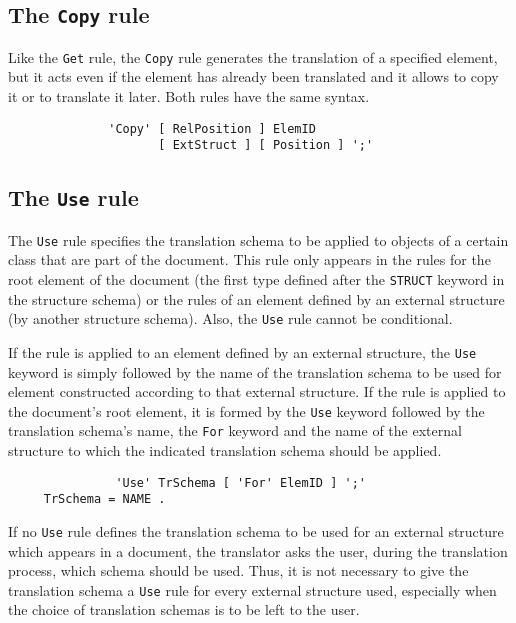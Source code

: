 \subsection{The {\tt Copy} rule}

Like the {\tt Get} rule, the {\tt Copy} rule generates the translation
of a specified element, but it acts even if the element has already been
translated and it allows to copy it or to translate it later.
Both rules have the same syntax.

\begin{verbatim}
              'Copy' [ RelPosition ] ElemID 
                     [ ExtStruct ] [ Position ] ';'
\end{verbatim}

\subsection{The {\tt Use} rule}

The {\tt Use} rule specifies the translation schema to be applied to
objects of a certain class that are part of the document.  This rule
only appears in the rules for the root element of the document (the
first type defined after the {\tt STRUCT} keyword in the structure
schema) or the rules of an element defined by an external structure
(by another structure schema).  Also, the {\tt Use} rule cannot be
conditional.

If the rule is applied to an element defined by an external structure,
the {\tt Use} keyword is simply followed by the name of the
translation schema to be used for element constructed  according to
that external structure.  If the rule is applied to the document's
root element, it is formed by the {\tt Use} keyword followed by the
translation schema's name, the {\tt For} keyword and the name of the
external structure to which the indicated translation schema should be
applied.

\begin{verbatim}
               'Use' TrSchema [ 'For' ElemID ] ';'
     TrSchema = NAME .
\end{verbatim}

If no {\tt Use} rule defines the translation schema to be used for an
external structure which appears in a document, the translator asks
the user, during the translation process, which schema should be used.
Thus, it is not necessary to give the translation schema a {\tt Use}
rule for every external structure used, especially when the choice of
translation schemas is to be left to the user.

